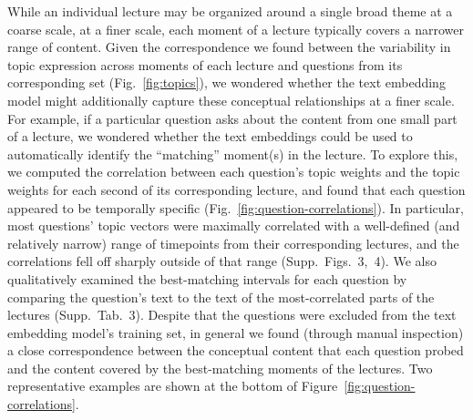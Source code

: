 \documentclass[10pt]{article}
\newcommand{\matchTab}{3}
\newcommand{\forcesCorrs}{3}
\newcommand{\bosCorrs}{4}
\begin{document}
While an individual lecture may be organized around a single broad theme at a
coarse scale, at a finer scale, each moment of a lecture typically covers a
narrower range of content. Given the correspondence we found between the
variability in topic expression across moments of each lecture and questions
from its corresponding set (Fig.~\ref{fig:topics}), we wondered whether the
text embedding model might additionally capture these conceptual relationships
at a finer scale. For example, if a particular question asks about the content
from one small part of a lecture, we wondered whether the text embeddings could
be used to automatically identify the ``matching'' moment(s) in the lecture. To
explore this, we computed the correlation between each question's topic weights
and the topic weights for each second of its corresponding lecture, and found
that each question appeared to be temporally specific
(Fig.~\ref{fig:question-correlations}). In particular, most questions' topic
vectors were maximally correlated with a well-defined (and relatively narrow)
range of timepoints from their corresponding lectures, and the correlations
fell off sharply outside of that range (Supp.~Figs.~\forcesCorrs,~\bosCorrs).
We also qualitatively examined the best-matching intervals for each question by
comparing the question's text to the text of the most-correlated parts of the
lectures (Supp.~Tab.~\matchTab). Despite that the questions were excluded from
the text embedding model's training set, in general we found (through manual
inspection) a close correspondence between the conceptual content that each
question probed and the content covered by the best-matching moments of the
lectures. Two representative examples are shown at the bottom of
Figure~\ref{fig:question-correlations}.
\end{document}
